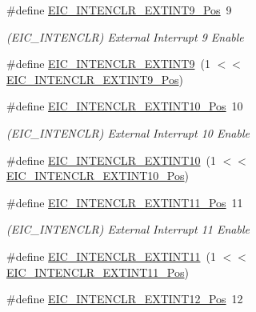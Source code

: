 \begin{DoxyCompactItemize}
\item 
\#define \mbox{\hyperlink{group___s_a_m_d21___e_i_c_gab3c4cf69b58d14ad07e3aa9b9a8eb94f}{E\+I\+C\+\_\+\+I\+N\+T\+E\+N\+C\+L\+R\+\_\+\+E\+X\+T\+I\+N\+T9\+\_\+\+Pos}}~9
\begin{DoxyCompactList}\small\item\em (E\+I\+C\+\_\+\+I\+N\+T\+E\+N\+C\+LR) External Interrupt 9 Enable \end{DoxyCompactList}\item 
\#define \mbox{\hyperlink{group___s_a_m_d21___e_i_c_ga453170ecc850c2e79ac5002c70acbd2f}{E\+I\+C\+\_\+\+I\+N\+T\+E\+N\+C\+L\+R\+\_\+\+E\+X\+T\+I\+N\+T9}}~(1 $<$$<$ \mbox{\hyperlink{group___s_a_m_d21___e_i_c_gab3c4cf69b58d14ad07e3aa9b9a8eb94f}{E\+I\+C\+\_\+\+I\+N\+T\+E\+N\+C\+L\+R\+\_\+\+E\+X\+T\+I\+N\+T9\+\_\+\+Pos}})
\item 
\#define \mbox{\hyperlink{group___s_a_m_d21___e_i_c_gaf6bc0d7f62df9ad67842a5e3c334077e}{E\+I\+C\+\_\+\+I\+N\+T\+E\+N\+C\+L\+R\+\_\+\+E\+X\+T\+I\+N\+T10\+\_\+\+Pos}}~10
\begin{DoxyCompactList}\small\item\em (E\+I\+C\+\_\+\+I\+N\+T\+E\+N\+C\+LR) External Interrupt 10 Enable \end{DoxyCompactList}\item 
\#define \mbox{\hyperlink{group___s_a_m_d21___e_i_c_gad58698119d36f348d1311745d13d536a}{E\+I\+C\+\_\+\+I\+N\+T\+E\+N\+C\+L\+R\+\_\+\+E\+X\+T\+I\+N\+T10}}~(1 $<$$<$ \mbox{\hyperlink{group___s_a_m_d21___e_i_c_gaf6bc0d7f62df9ad67842a5e3c334077e}{E\+I\+C\+\_\+\+I\+N\+T\+E\+N\+C\+L\+R\+\_\+\+E\+X\+T\+I\+N\+T10\+\_\+\+Pos}})
\item 
\#define \mbox{\hyperlink{group___s_a_m_d21___e_i_c_gae13f645c92feaed280646ec20ba9b0ae}{E\+I\+C\+\_\+\+I\+N\+T\+E\+N\+C\+L\+R\+\_\+\+E\+X\+T\+I\+N\+T11\+\_\+\+Pos}}~11
\begin{DoxyCompactList}\small\item\em (E\+I\+C\+\_\+\+I\+N\+T\+E\+N\+C\+LR) External Interrupt 11 Enable \end{DoxyCompactList}\item 
\#define \mbox{\hyperlink{group___s_a_m_d21___e_i_c_gab925794384448e9c251142e4cd80044a}{E\+I\+C\+\_\+\+I\+N\+T\+E\+N\+C\+L\+R\+\_\+\+E\+X\+T\+I\+N\+T11}}~(1 $<$$<$ \mbox{\hyperlink{group___s_a_m_d21___e_i_c_gae13f645c92feaed280646ec20ba9b0ae}{E\+I\+C\+\_\+\+I\+N\+T\+E\+N\+C\+L\+R\+\_\+\+E\+X\+T\+I\+N\+T11\+\_\+\+Pos}})
\item 
\#define \mbox{\hyperlink{group___s_a_m_d21___e_i_c_ga5ca5b6366c5eb9e8b7fb456e03ace391}{E\+I\+C\+\_\+\+I\+N\+T\+E\+N\+C\+L\+R\+\_\+\+E\+X\+T\+I\+N\+T12\+\_\+\+Pos}}~12
$$
\end{DoxyCompactItemize}
